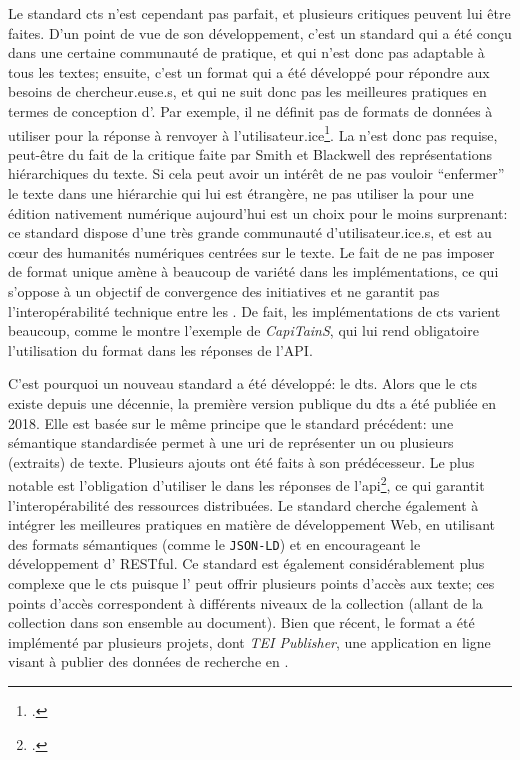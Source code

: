 Le standard \gls{cts} n'est cependant pas parfait, et plusieurs critiques peuvent lui être faites. D'un point de vue de son développement, c'est un standard qui a été conçu dans une certaine communauté de pratique, et qui n'est donc pas adaptable à tous les textes; ensuite, c'est un format qui a été développé pour répondre aux besoins de chercheur.euse.s, et qui ne suit donc pas les meilleures pratiques en termes de conception d'\api{}. Par exemple, il ne définit pas de formats de données à utiliser pour la réponse à renvoyer à l'utilisateur.ice\footcite[p. 2]{almas_distributed_2021}. La \tei{} n'est donc pas requise, peut-être du fait de la critique faite par Smith et Blackwell des représentations hiérarchiques du texte. Si cela peut avoir un intérêt de ne pas vouloir \enquote{enfermer} le texte dans une hiérarchie qui lui est étrangère, ne pas utiliser la \tei{} pour une édition nativement numérique aujourd'hui est un choix pour le moins surprenant: ce standard dispose d'une très grande communauté d'utilisateur.ice.s, et est au cœur des humanités numériques centrées sur le texte. Le fait de ne pas imposer de format unique amène à beaucoup de variété dans les implémentations, ce qui s'oppose à un objectif de convergence des initiatives et ne garantit pas l'interopérabilité technique entre les \api{}. De fait, les implémentations de \gls{cts} varient beaucoup, comme le montre l'exemple de \textit{CapiTainS}, qui lui rend obligatoire l'utilisation du format \xml{} dans les réponses de l'API. 

C'est pourquoi un nouveau standard a été développé: le \gls{dts}. Alors que le \gls{cts} existe depuis une décennie, la première version publique du \gls{dts} a été publiée en 2018. Elle est basée sur le même principe que le standard précédent: une sémantique standardisée permet à une \gls{uri} de représenter un ou plusieurs (extraits) de texte. Plusieurs ajouts ont été faits à son prédécesseur. Le plus notable est l'obligation d'utiliser le \xmltei{} dans les réponses de l'\gls{api}\footcite[p. 3]{almas_distributed_2021}, ce qui garantit l'interopérabilité des ressources distribuées. Le standard cherche également à intégrer les meilleures pratiques en matière de développement Web, en utilisant des formats sémantiques (comme le \texttt{JSON-LD}) et en encourageant le développement d'\api{} RESTful. Ce standard est également considérablement plus complexe que le \gls{cts} puisque l'\api{} peut offrir plusieurs points d'accès aux texte; ces points d'accès correspondent à différents niveaux de la collection (allant de la collection dans son ensemble au document). Bien que récent, le format a été implémenté par plusieurs projets, dont \textit{TEI Publisher}, une application en ligne visant à publier des données de recherche en \tei{}.

